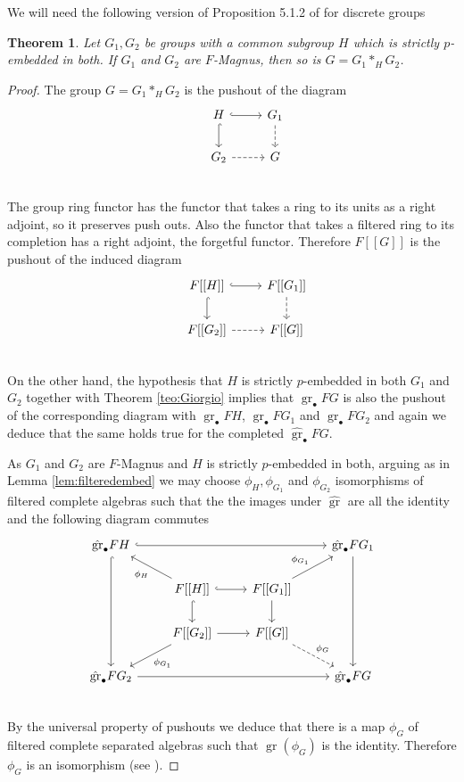 \documentclass[10pt, oneside]{amsart}
\newcommand{\gr}{\operatorname{gr}} %
\newtheorem{theorem}{Theorem}[section]
\theoremstyle{definition}
\theoremstyle{remark}
\theoremstyle{plain}
\begin{document}
We will need the following version of Proposition 5.1.2 of \cite{GiorgioThesis} for discrete groups



\begin{theorem}\label{teo:Giorgiofiltered} Let $G_1,G_2$ be groups with a common subgroup $H$ which is strictly $p$-embedded in both. If $G_1$ and $G_2$
 are $F$-Magnus, then so is $G=G_1\ast_HG_2$. \end{theorem}
 \begin{proof} The group $G=G_1\ast_HG_2$ is the pushout of the diagram
  \[\begin{tikzcd}
    &H\ar[d, hook]\ar[r,hook]&G_1\ar[d,dashed]\\
   &G_2\ar[r,dashed]&G\\
\end{tikzcd}
\] 
 The group ring functor has the functor that takes a ring to its units as a right adjoint, so it preserves push outs. Also the functor that takes a filtered ring to its completion has a right adjoint, the forgetful functor. Therefore $F[[G]]$ is the pushout of the induced diagram
   \[\begin{tikzcd}
    &F[[H]]\ar[d, hook]\ar[r,hook]&F[[G_1]]\ar[d,dashed]\\
   &F[[G_2]]\ar[r,dashed]&F[[G]]\\
\end{tikzcd}
\] 
 On the other hand, the hypothesis that $H$  is strictly $p$-embedded in both $G_1$ and $G_2$ together with Theorem \ref{teo:Giorgio}  implies that $\gr_\bullet FG$ is also the pushout of the corresponding diagram with  $\gr_\bullet FH$, $\gr_\bullet FG_1$ and $\gr_\bullet FG_2$ and again we deduce that the same holds true for the completed $\hat{\gr}_\bullet FG$. 
 
 As $G_1$ and $G_2$ are $F$-Magnus and $H$ is strictly $p$-embedded in both, arguing as in Lemma \ref{lem:filteredembed} we may choose $\phi_H,\phi_{G_1}$ and $\phi_{G_2}$ isomorphisms of filtered complete algebras such that the the images under $\hat{\gr}$ are all the identity and the following diagram commutes 
 \[\begin{tikzcd}
 \hat{\gr}_\bullet FH\ar[rrr,hook]\ar[ddd,hook]&&&\hat{\gr}_\bullet FG_1\ar[ddd]\\
    &F[[H]]\ar[d, hook]\ar[r,hook]\ar[ul,"\phi_H"]&F[[G_1]]\ar[d]\ar[ur,"\phi_{G_1}"]&\\
   &F[[G_2]]\ar[r]\ar[dl,"\phi_{G_1}"]&F[[G]]\ar[rd,dashed,"\phi_G"]&\\
   \hat{\gr}_\bullet FG_2\ar[rrr]&&&\hat{\gr}_\bullet FG\\
\end{tikzcd}
\] 
By the universal property of pushouts we deduce that there is a map $\phi_G$ of filtered complete separated algebras such that $\gr(\phi_G)$ is the identity. Therefore $\phi_G$ is an isomorphism  (see \cite[Lemma 2.4]{SuciuWangT}).
 \end{proof}
\end{document}
